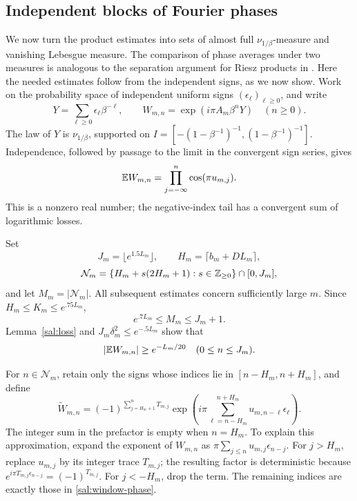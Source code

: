 \subsection{Independent blocks of Fourier phases}

We now turn the product estimates into sets of almost full
$\nu_{1/\beta}$-measure and vanishing Lebesgue measure.  The comparison
of phase averages under two measures is analogous to the separation
argument for Riesz products in \cite[Section~1.1, Theorem~1.2]{Peyriere1975}.
Here the needed estimates follow from the independent signs, as we now
show.  Work on the
probability space of independent uniform signs $(\epsilon_\ell)_{\ell\ge0}$,
and write
\[
 Y=\sum_{\ell\ge0}\epsilon_\ell\beta^{-\ell},\qquad
 W_{m,n}=\exp(i\pi A_m\beta^nY)\quad(n\ge0).
\]
The law of $Y$ is $\nu_{1/\beta}$, supported on
$I=[-(1-\beta^{-1})^{-1},(1-\beta^{-1})^{-1}]$.
Independence, followed by passage to the limit in the convergent sign
series, gives
\begin{equation}\label{sal:expectation}
 \mathbb E W_{m,n}=\prod_{j=-\infty}^n\cos(\pi u_{m,j}).
\end{equation}
This is a nonzero real number; the negative-index tail has a convergent
sum of logarithmic losses.

Set
\[
 J_m=\lfloor e^{1.5L_m}\rfloor,\qquad
 H_m=\lceil b_m+DL_m\rceil,
\]
\[
 \mathcal N_m=\{H_m+s(2H_m+1):s\in\mathbb Z_{\ge0}\}\cap[0,J_m],
\]
and let $M_m=|\mathcal N_m|$.  All subsequent estimates concern
sufficiently large $m$.  Since $H_m\le K_m\le e^{.75L_m}$,
\begin{equation}\label{sal:block-count}
 e^{.7L_m}\le M_m\le J_m+1.
\end{equation}
Lemma~\ref{sal:loss} and $J_m\delta_m^2\le e^{-.5L_m}$ show that
\begin{equation}\label{sal:mean-lower}
 |\mathbb E W_{m,n}|\ge e^{-L_m/20}
             \quad(0\le n\le J_m).
\end{equation}

For $n\in\mathcal N_m$, retain only the signs whose indices lie in
$[n-H_m,n+H_m]$, and define
\begin{equation}\label{sal:window-phase}
 \widetilde W_{m,n}
 =(-1)^{\sum_{j=H_m+1}^nT_{m,j}}
   \exp\left(i\pi\sum_{\ell=n-H_m}^{n+H_m}
                      u_{m,n-\ell}\epsilon_\ell\right).
\end{equation}
The integer sum in the prefactor is empty when $n=H_m$.
To explain this approximation, expand the exponent of $W_{m,n}$ as
$\pi\sum_{j\le n}u_{m,j}\epsilon_{n-j}$.  For $j>H_m$, replace
$u_{m,j}$ by its integer trace $T_{m,j}$; the resulting factor is
deterministic because
$e^{i\pi T_{m,j}\epsilon_{n-j}}=(-1)^{T_{m,j}}$.
For $j<-H_m$, drop the term.  The remaining indices are exactly those
in \eqref{sal:window-phase}.

